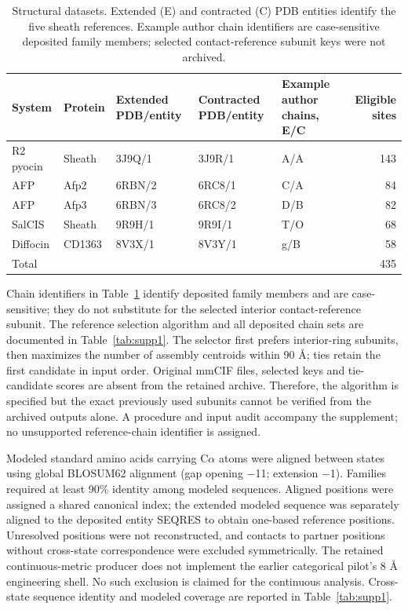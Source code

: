 \documentclass[11pt,a4paper]{article}
\begin{document}
\begin{table}[htbp]
\centering
\caption{Structural datasets. Extended (E) and contracted (C) PDB entities identify the five sheath references. Example author chain identifiers are case-sensitive deposited family members; selected contact-reference subunit keys were not archived.}
\label{tab:structures}
\footnotesize
\setlength{\tabcolsep}{3pt}
\renewcommand{\arraystretch}{1.25}
\begin{tabularx}{\textwidth}{@{}>{\raggedright\arraybackslash}X>{\raggedright\arraybackslash}p{}>{\raggedright\arraybackslash}p{}>{\raggedright\arraybackslash}p{}>{\raggedright\arraybackslash}p{}r@{}}
\toprule
\textbf{System} & \textbf{Protein} & \textbf{Extended PDB/entity} & \textbf{Contracted PDB/entity} & \textbf{Example author chains, E/C} & \textbf{Eligible sites} \\
\midrule
R2 pyocin & Sheath & 3J9Q/1 & 3J9R/1 & A/A & 143 \\
AFP & Afp2 & 6RBN/2 & 6RC8/1 & C/A & 84 \\
AFP & Afp3 & 6RBN/3 & 6RC8/2 & D/B & 82 \\
SalCIS & Sheath & 9R9H/1 & 9R9I/1 & T/O & 68 \\
Diffocin & CD1363 & 8V3X/1 & 8V3Y/1 & g/B & 58 \\
Total &  &  &  &  & 435 \\
\bottomrule
\end{tabularx}
\end{table}

Chain identifiers in Table~\ref{tab:structures} identify deposited family members and are case-sensitive; they do not substitute for the selected interior contact-reference subunit. The reference selection algorithm and all deposited chain sets are documented in Table~\ref{tab:supp1}. The selector first prefers interior-ring subunits, then maximizes the number of assembly centroids within 90 \AA{}; ties retain the first candidate in input order. Original mmCIF files, selected keys and tie-candidate scores are absent from the retained archive. Therefore, the algorithm is specified but the exact previously used subunits cannot be verified from the archived outputs alone. A procedure and input audit accompany the supplement; no unsupported reference-chain identifier is assigned.

Modeled standard amino acids carrying C\ensuremath{\alpha} atoms were aligned between states using global BLOSUM62 alignment (gap opening \ensuremath{-}11; extension \ensuremath{-}1). Families required at least 90\% identity among modeled sequences. Aligned positions were assigned a shared canonical index; the extended modeled sequence was separately aligned to the deposited entity SEQRES to obtain one-based reference positions. Unresolved positions were not reconstructed, and contacts to partner positions without cross-state correspondence were excluded symmetrically. The retained continuous-metric producer does not implement the earlier categorical pilot's 8 \AA{} engineering shell. No such exclusion is claimed for the continuous analysis. Cross-state sequence identity and modeled coverage are reported in Table~\ref{tab:supp1}.
\end{document}
